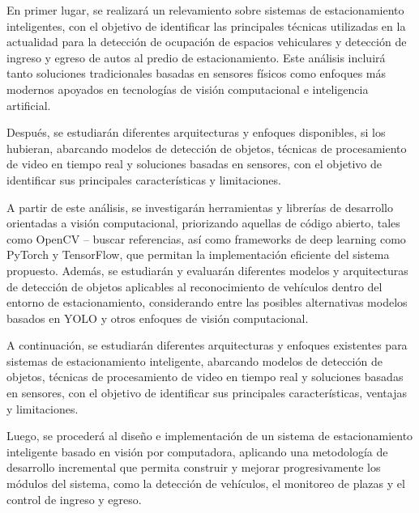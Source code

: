 \documentclass[12pt,a4paper]{article}
\begin{document}
En primer lugar, se realizará un relevamiento sobre sistemas de estacionamiento inteligentes, con el objetivo de identificar las principales técnicas utilizadas en la actualidad para la detección de ocupación de espacios vehiculares y detección de ingreso y egreso de autos al predio de estacionamiento. Este análisis incluirá tanto soluciones tradicionales basadas en sensores físicos como enfoques más modernos apoyados en tecnologías de visión computacional e inteligencia artificial.  

Después, se estudiarán diferentes arquitecturas y enfoques disponibles, si los hubieran, abarcando modelos de detección de objetos, técnicas de procesamiento de video en tiempo real y soluciones basadas en sensores, con el objetivo de identificar sus principales características y limitaciones. 

A partir de este análisis, se investigarán herramientas y librerías de desarrollo orientadas a visión computacional, priorizando aquellas de código abierto, tales como OpenCV -- buscar referencias, así como frameworks de deep learning como PyTorch y TensorFlow, que permitan la implementación eficiente del sistema propuesto. Además, se estudiarán y evaluarán diferentes modelos y arquitecturas de detección de objetos aplicables al reconocimiento de vehículos dentro del entorno de estacionamiento, considerando entre las posibles alternativas modelos basados en YOLO \cite{terven2023comprehensive}  y otros enfoques de visión computacional.


A continuación, se estudiarán diferentes arquitecturas y enfoques existentes para sistemas de estacionamiento inteligente, abarcando modelos de detección de objetos, técnicas de procesamiento de video en tiempo real y soluciones basadas en sensores, con el objetivo de identificar sus principales características, ventajas y limitaciones.


Luego, se procederá al diseño e implementación de un sistema de estacionamiento inteligente basado en visión por computadora, aplicando una metodología de desarrollo incremental que permita construir y mejorar progresivamente los módulos del sistema, como la detección de vehículos, el monitoreo de plazas y el control de ingreso y egreso. 
\end{document}
